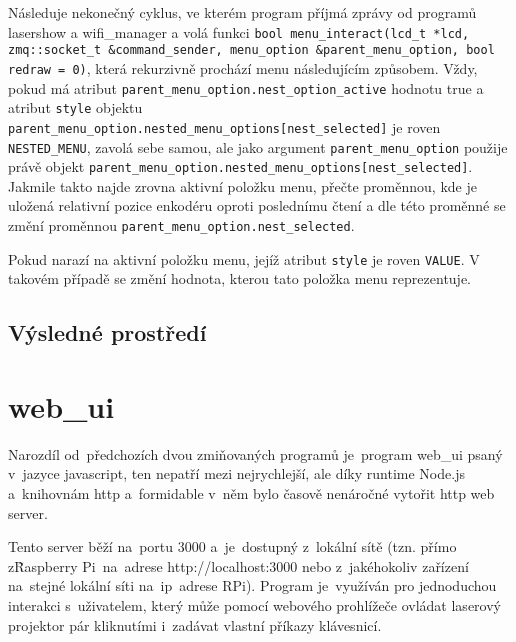Následuje nekonečný cyklus, ve kterém program příjmá zprávy od programů lasershow a wifi\_manager a volá funkci \texttt{bool menu_interact(lcd_t *lcd, zmq::socket_t &command_sender, menu_option &parent_menu_option, bool redraw = 0)}, která rekurzivně prochází menu následujícím způsobem.
Vždy, pokud má atribut \texttt{parent_menu_option.nest_option_active} hodnotu true a atribut \texttt{style} objektu \texttt{parent_menu_option.nested_menu_options[nest_selected]} je roven \texttt{NESTED_MENU}, zavolá sebe samou, ale jako argument \texttt{parent_menu_option} použije právě objekt \texttt{parent_menu_option.nested_menu_options[nest_selected]}.
Jakmile takto najde zrovna aktivní položku menu, přečte proměnnou, kde je uložená relativní pozice enkodéru oproti poslednímu čtení a dle této proměnné se změní proměnnou \texttt{parent_menu_option.nest_selected}.

Pokud narazí na aktivní položku menu, jejíž atribut \texttt{style} je roven \texttt{VALUE}. V takovém případě se změní hodnota, kterou tato položka menu reprezentuje.

\subsection{Výsledné prostředí}

\section{web\_ui}

Narozdíl od~předchozích dvou zmiňovaných programů je~program web\_ui psaný v~jazyce javascript, ten nepatří mezi nejrychlejší, ale díky runtime Node.js a~knihovnám http a~formidable v~něm bylo časově nenáročné vytořit http web server.

Tento server běží na~portu 3000 a~je~dostupný z~lokální sítě (tzn. přímo z\~Raspberry Pi~na~adrese http://localhost:3000 nebo z~jakéhokoliv zařízení na~stejné lokální síti na~ip~adrese RPi).
Program je~využíván pro jednoduchou interakci s~uživatelem, který může pomocí webového prohlížeče ovládat laserový projektor pár kliknutími i~zadávat vlastní příkazy klávesnicí.


\inputminted{js}{code_examples/http_static_files.js}

